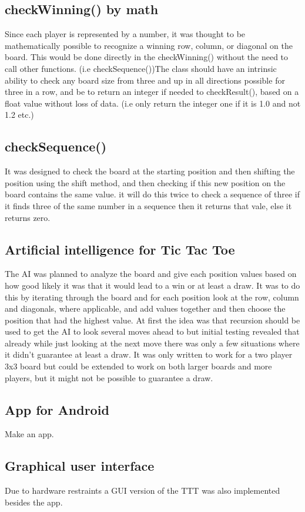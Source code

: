 \documentclass[a4paper,10pt]{article}
\begin{document}
		\subsection{checkWinning() by math}
		Since each player is represented by a number, it was thought to be mathematically possible to recognize a winning row, column, or diagonal on the board.  This would be done directly in the checkWinning() without the need to call other functions. (i.e checkSequence())The class should have an intrinsic ability to check any board size from three and up in all directions possible for three in a row, and be to return an integer if needed to checkResult(), based on a float value without loss of data.  (i.e only return the integer one if it is 1.0 and not 1.2 etc.)
		
		\subsection{checkSequence()}
		It was designed to check the board at the starting position and then shifting the position using the shift method, and then checking if this new position on the board contains the same value. it will do this twice to check a sequence of three if it finds three of the same number in a sequence then it returns that vale, else it returns zero.
		\subsection{Artificial intelligence for Tic Tac Toe}
		The AI was planned to analyze the board and give each position values based on how good likely it was that it would lead to a win or at least a draw. It was to do this by iterating through the board and for each position look at the row, column and diagonals, where applicable, and add values together and then choose the position that had the highest value. At first the idea was  that recursion should be used to get the AI to look several moves ahead to but initial testing revealed that already while just looking at the next move there was only a few situations where it didn’t guarantee at least a draw.
		It was only written to work for a two player 3x3 board but could be extended to work on both larger boards and more players, but it might not be possible to guarantee a draw.
		
		\subsection{App for Android}
		Make an app.
		\subsection{Graphical user interface}
		Due to hardware restraints a GUI version of the TTT was also implemented besides the app. 
		 
\end{document}
